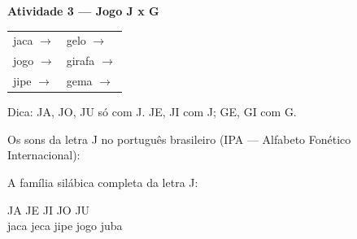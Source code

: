 \begin{consolidacao}
\textbf{Atividade 3 --- Jogo J x G}


\begin{center}
\begin{tabular}{ll}
jaca \quad $\rightarrow$ \underline{\hspace{2cm}} & gelo \quad $\rightarrow$ \underline{\hspace{2cm}} \\
jogo \quad $\rightarrow$ \underline{\hspace{2cm}} & girafa \quad $\rightarrow$ \underline{\hspace{2cm}} \\
jipe \quad $\rightarrow$ \underline{\hspace{2cm}} & gema \quad $\rightarrow$ \underline{\hspace{2cm}}
\end{tabular}
\end{center}
Dica: JA, JO, JU s\'o com J. JE, JI com J; GE, GI com G.

\end{consolidacao}


\begin{sonsdaletra}
Os sons da letra J no portugu\^es{} brasileiro (IPA --- Alfabeto Fon\'etico Internacional):

\end{sonsdaletra}


\begin{familiasilabica}
A fam\'ilia sil\'abica completa da letra J:

\begin{center}
JA \quad JE \quad JI \quad JO \quad JU \\[0.5em] jaca \quad jeca \quad jipe \quad jogo \quad juba
\end{center}
\end{familiasilabica}



